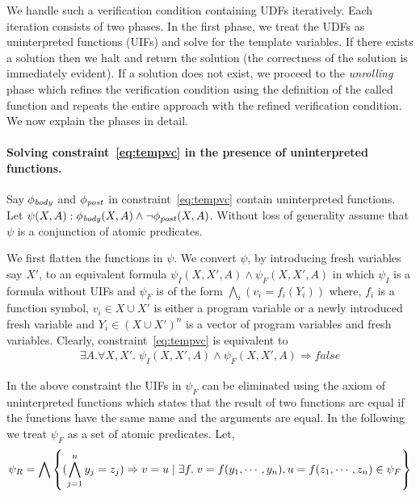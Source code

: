 \documentclass[a4paper,10pt]{article}
\begin{document}
We handle such a verification condition containing UDFs iteratively. Each iteration consists of two phases. In the first phase, we treat the UDFs as uninterpreted functions (UIFs) and solve for the template variables.
If there exists a solution then we halt and return the solution (the correctness of the solution is immediately evident).
If a solution does not exist, we proceed to the \emph{unrolling} phase which refines the verification condition using the definition of the called function and repeats the entire approach with the refined verification condition. We now explain the phases in detail.

\paragraph{Solving constraint~\ref{eq:tempvc} in the presence of uninterpreted functions.}

Say $\mathit{\phi_{body}}$ and $\mathit{\phi_{post}}$ in constraint~\ref{eq:tempvc} contain uninterpreted functions.
Let $\psi(X,A): \mathit{\phi_{body}}(X,A) \wedge \neg \mathit{\phi_{post}}(X,A)$.
Without loss of generality assume that $\psi$ is a conjunction of atomic predicates.

We first flatten the functions in $\psi$. 
We convert $\psi$, by introducing fresh variables say $X'$, to an equivalent formula $\psi_{I}(X,X',A) \wedge \psi_{F}(X,X',A)$ in which
$\psi_I$ is a formula without UIFs and 
$\psi_{F}$ is of the form $\bigwedge_i (v_i = f_i(Y_i))$ where, $f_i$ is a function symbol,  
$v_i \in X \cup X'$ is either a program variable or a newly introduced fresh variable 
and $Y_i \in (X \cup X')^n$ is a vector of program variables and fresh variables.  
Clearly, constraint~\ref{eq:tempvc} is equivalent to 
%
\begin{align}
\exists A. \forall X,X'. \; \psi_{I}(X,X',A) \wedge \psi_{F}(X,X',A) \Rightarrow false \label{eq:c2}
\end{align}

In the above constraint the UIFs in $\psi_{F}$ can be eliminated using the axiom of uninterpreted functions which states that the result of  two functions are equal if the functions have the same name and the arguments are equal. In the following we treat $\psi_F$ as a set of atomic predicates.
Let,
%
\begin{align}
\psi_R = \bigwedge \left\lbrace (\bigwedge \limits_{j=1}^{n} y_j = z_j) \Rightarrow v = u \; | \; \exists f. \; v = f(y_1,\cdots,y_n), u = f(z_1,\cdots,z_n) \in \psi_F \right\rbrace  
\end{align}
\end{document}
